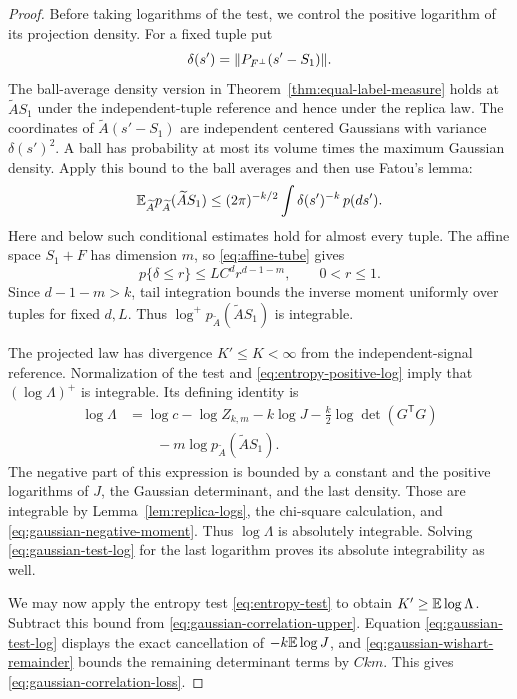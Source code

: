 \begin{proof}
Before taking logarithms of the test, we control the positive logarithm
of its projection density. For a fixed tuple put
\[
 \delta(s')=\lVert P_{F^\perp}(s'-S_1)\rVert.
\]
The ball-average density version in
Theorem~\ref{thm:equal-label-measure} holds at
$\widetilde A S_1$ under the independent-tuple reference and hence under
the replica law. The coordinates of $\widetilde A(s'-S_1)$ are
independent centered Gaussians with variance $\delta(s')^2$.
A ball has probability at most its volume times the maximum Gaussian
density. Apply this bound to the ball averages and then use Fatou's lemma:
\begin{equation}\label{eq:gaussian-negative-moment}
 \mathbb E_{\widetilde A}p_{\widetilde A}(\widetilde A S_1)
 \le (2\pi)^{-k/2}\int\delta(s')^{-k}\,p(ds').
\end{equation}
Here and below such conditional estimates hold for almost every tuple.
The affine space $S_1+F$ has dimension $m$, so
\eqref{eq:affine-tube} gives
\[
 p\{\delta\le r\}\le LC^d r^{d-1-m},\qquad 0<r\le1.
\]
Since $d-1-m>k$, tail integration bounds the inverse moment uniformly
over tuples for fixed $d,L$. Thus
$\log^+p_{\widetilde A}(\widetilde A S_1)$ is integrable.

The projected law has divergence $K'\le K<\infty$ from the
independent-signal reference. Normalization of the test and
\eqref{eq:entropy-positive-log} imply that $(\log\Lambda)^+$ is
integrable. Its defining identity is
\begin{equation}\label{eq:gaussian-test-log}
 \begin{aligned}
 \log\Lambda
 &=\log c-\log Z_{k,m}-k\log J
   -\frac{k}{2}\log\det(G^{\mathsf T}G)\\
 &\qquad-m\log p_{\widetilde A}(\widetilde A S_1).
 \end{aligned}
\end{equation}
The negative part of this expression is bounded by a constant and the
positive logarithms of $J$, the Gaussian determinant, and the last
density. Those are integrable by Lemma~\ref{lem:replica-logs}, the
chi-square calculation, and \eqref{eq:gaussian-negative-moment}.
Thus $\log\Lambda$ is absolutely integrable. Solving
\eqref{eq:gaussian-test-log} for the last logarithm proves its absolute
integrability as well.

We may now apply the entropy test \eqref{eq:entropy-test} to obtain
$K'\ge\mathbb E\log\Lambda$. Subtract this bound from
\eqref{eq:gaussian-correlation-upper}. Equation
\eqref{eq:gaussian-test-log} displays the exact cancellation of
$-k\mathbb E\log J$, and \eqref{eq:gaussian-wishart-remainder} bounds the
remaining determinant terms by $Ckm$. This gives
\eqref{eq:gaussian-correlation-loss}.
\end{proof}

